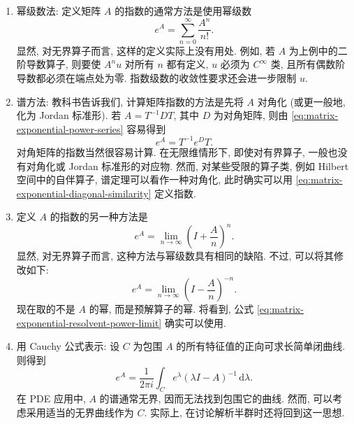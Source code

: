 \begin{enumerate}\item 幂级数法: 定义矩阵 $A$ 的指数的通常方法是使用幂级数
\begin{equation}\label{eq:matrix-exponential-power-series}
e^A=\sum_{n=0}^\infty\dfrac{A^n}{n!}.
\end{equation}
显然, 对无界算子而言, 这样的定义实际上没有用处. 例如, 若 $A$ 为上例中的二阶导数算子, 则要使 $A^nu$ 对所有 $n$ 都有定义, $u$ 必须为 $C^\infty$ 类, 且所有偶数阶导数都必须在端点处为零. 指数级数的收敛性要求还会进一步限制 $u$.

\item 谱方法: 教科书告诉我们, 计算矩阵指数的方法是先将 $A$ 对角化 (或更一般地, 化为 Jordan 标准形). 若 $A=T^{-1}DT$, 其中 $D$ 为对角矩阵, 则由 \eqref{eq:matrix-exponential-power-series} 容易得到
\begin{equation}\label{eq:matrix-exponential-diagonal-similarity}
e^A=T^{-1}e^DT.
\end{equation}
对角矩阵的指数当然很容易计算. 在无限维情形下, 即使对有界算子, 一般也没有对角化或 Jordan 标准形的对应物. 然而, 对某些受限的算子类, 例如 Hilbert 空间中的自伴算子, 谱定理可以看作一种对角化, 此时确实可以用 \eqref{eq:matrix-exponential-diagonal-similarity} 定义指数.

\item 定义 $A$ 的指数的另一种方法是
\begin{equation}\label{eq:matrix-exponential-positive-power-limit}
e^A=\lim_{n\to\infty}\left(I+\dfrac{A}{n}\right)^n.
\end{equation}
显然, 对无界算子而言, 这种方法与幂级数具有相同的缺陷. 不过, 可以将其修改如下:
\begin{equation}\label{eq:matrix-exponential-resolvent-power-limit}
e^A=\lim_{n\to\infty}\left(I-\dfrac{A}{n}\right)^{-n}.
\end{equation}
现在取的不是 $A$ 的幂, 而是预解算子的幂. 将看到, 公式 \eqref{eq:matrix-exponential-resolvent-power-limit} 确实可以使用.

\item 用 Cauchy 公式表示: 设 $C$ 为包围 $A$ 的所有特征值的正向可求长简单闭曲线. 则得到
\begin{equation}\label{eq:matrix-exponential-cauchy-integral}
e^A=\dfrac{1}{2\pi i}\int_C e^\lambda(\lambda I-A)^{-1}\,\mathrm{d}\lambda.
\end{equation}
在 PDE 应用中, $A$ 的谱通常无界, 因而无法找到包围它的曲线. 然而, 可以考虑采用适当的无界曲线作为 $C$. 实际上, 在讨论解析半群时还将回到这一思想.


\end{enumerate}
